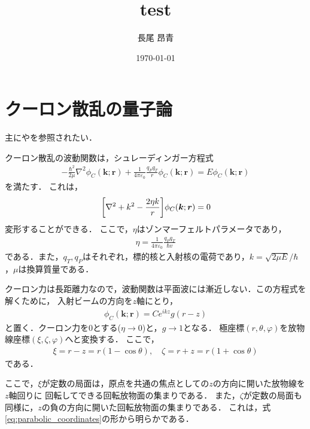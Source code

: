 \documentclass[a4paper,11pt]{ltjsarticle}
\begin{document}
\title{test}
\author{長尾 昂青}
\date{\today}
\maketitle

\tableofcontents

\newpage
\section{クーロン散乱の量子論}

主に\cite{canto2013scattering}や\cite{BN00026961}を参照されたい．

クーロン散乱の波動関数は，シュレーディンガー方程式
\begin{align}\label{eq:coulomb_scattering_schrodinger}
  - \frac{\hbar^2}{2 \mu} \nabla^2 \phi_C(\bm{k}; \bm{r}) 
  + \frac{1}{4 \pi \varepsilon_0} \frac{q_P q_T}{r} \phi_C(\bm{k}; \bm{r}) = E\phi_C(\bm{k}; \bm{r})
\end{align}
を満たす．
これは，
\begin{align}\label{eq:coulomb_s_schro_rev}
  \qty[\nabla^2 + k^2- \frac{2\eta k}{r}] \phi_C(\bm{k}; \bm{r}) = 0
\end{align}
変形することができる．
ここで，$\eta$はゾンマーフェルトパラメータであり，
\begin{align}
  \eta = \frac{1}{4 \pi \varepsilon_0} \frac{q_P q_T}{\hbar v}
\end{align}
である．また，$q_T, q_P$はそれぞれ，標的核と入射核の電荷であり，$k = \sqrt{2\mu E}/\hbar$，$\mu$は換算質量である．

クーロン力は長距離力なので，波動関数は平面波には漸近しない．この方程式を解くために，
入射ビームの方向を$z$軸にとり，
\begin{align}\label{eq:coulomb_s_initial_ansatz}
  \phi_C(\bm{k};\bm{r}) = C e^{ikz}g(r-z)
\end{align}
と置く．クーロン力を0とする($\eta \rightarrow 0$)と，$g \rightarrow 1$となる．
極座標$(r, \theta, \varphi)$を放物線座標$(\xi, \zeta, \varphi)$へと変換する．
ここで，
\begin{align}\label{eq:parabolic_coordinates}
  \xi = r-z = r(1-\cos \theta), \quad \zeta = r + z = r(1+ \cos \theta)
\end{align}
である．

ここで，$\xi$が定数の局面は，原点を共通の焦点としての$z$の方向に開いた放物線を$z$軸回りに
回転してできる回転放物面の集まりである．
また，$\zeta$が定数の局面も同様に，$z$の負の方向に開いた回転放物面の集まりである．
これは，式\ref{eq:parabolic_coordinates}の形から明らかである．
\end{document}
